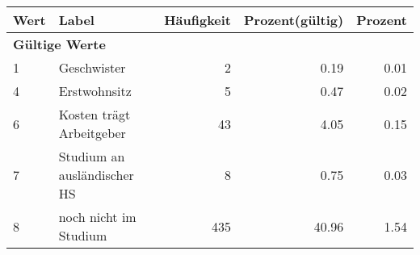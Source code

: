      \begin{longtable}{lXrrr}
     \toprule
     \textbf{Wert} & \textbf{Label} & \textbf{Häufigkeit} & \textbf{Prozent(gültig)} & \textbf{Prozent} \\
     \endhead
     \midrule
     \multicolumn{5}{l}{\textbf{Gültige Werte}}\\

     1 &
     \multicolumn{1}{X}{ Geschwister   } &


       \num{2} &
       \num[round-mode=places,round-precision=2]{0,19} &
         \num[round-mode=places,round-precision=2]{0,01} \\

     4 &
     \multicolumn{1}{X}{ Erstwohnsitz   } &


       \num{5} &
       \num[round-mode=places,round-precision=2]{0,47} &
         \num[round-mode=places,round-precision=2]{0,02} \\

     6 &
     \multicolumn{1}{X}{ Kosten trägt Arbeitgeber   } &


       \num{43} &
       \num[round-mode=places,round-precision=2]{4,05} &
         \num[round-mode=places,round-precision=2]{0,15} \\

     7 &
     \multicolumn{1}{X}{ Studium an ausländischer HS   } &


       \num{8} &
       \num[round-mode=places,round-precision=2]{0,75} &
         \num[round-mode=places,round-precision=2]{0,03} \\

     8 &
     \multicolumn{1}{X}{ noch nicht im Studium   } &


       \num{435} &
       \num[round-mode=places,round-precision=2]{40,96} &
         \num[round-mode=places,round-precision=2]{1,54} \\


\end{longtable}
